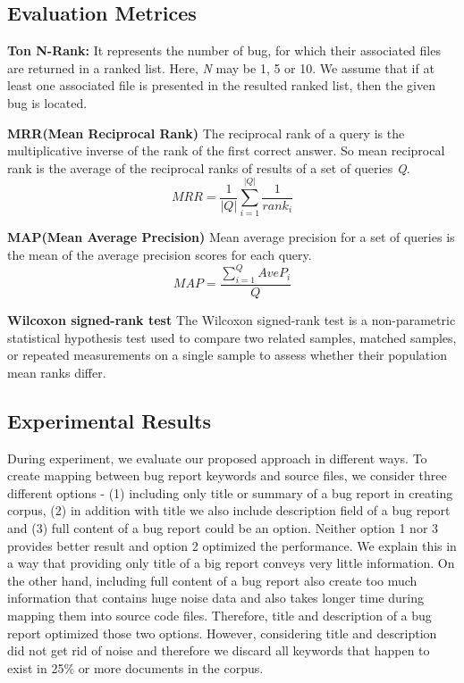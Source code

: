 \documentclass[conference]{IEEEtran}
\begin{document}
\subsection{Evaluation Metrices}
\textbf{Ton N-Rank:} It represents the number of bug, for which their associated files are returned in a ranked list. Here, \textit{N} may be 1, 5 or 10. We assume that if at least one associated file is presented in the resulted ranked list, then the given bug is located.

\textbf{MRR(Mean Reciprocal Rank)}
The reciprocal rank of a query is the multiplicative inverse of the rank of the first correct answer. So mean reciprocal rank is the average of the reciprocal ranks of results of a set of queries \textit{Q}.
\begin{equation}
MRR=\frac{1}{\left | Q \right |}\sum_{i=1}^{\left | Q \right |}\frac{1}{rank_{i}}
\end{equation}

\textbf{MAP(Mean Average Precision)}
Mean average precision for a set of queries is the mean of the average precision scores for each query.
\begin{equation}
MAP=\frac{\sum_{i=1}^{Q}AveP_{i}}{Q}
\end{equation}

\textbf{Wilcoxon signed-rank test}
The Wilcoxon signed-rank test is a non-parametric statistical hypothesis test used to compare two related samples, matched samples, or repeated measurements on a single sample to assess whether their population mean ranks differ.

\subsection{Experimental Results}
During experiment, we evaluate our proposed approach in different ways. To create mapping between bug report keywords and source files, we consider three different options - (1) including only title or summary of a bug report in creating corpus, (2) in addition with title we also include description field of a bug report and (3) full content of a bug report could be an option. Neither option 1 nor 3 provides better result and option 2 optimized the performance. We explain this in a way that providing only title of a big report conveys very little information. On the other hand, including full content of a bug report also create too much information that contains huge noise data and also takes longer time during mapping them into source code files. Therefore, title and description of a bug report optimized those two options. However, considering title and description did not get rid of noise and therefore we discard all keywords that happen to exist in 25\% or more documents in the corpus.
\end{document}

